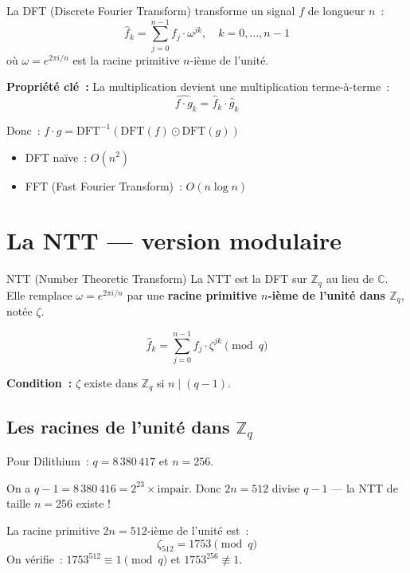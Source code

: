 \documentclass[12pt, a4paper]{article}
\newcommand{\Zq}{\mathbb{Z}_q}
\begin{document}
La DFT (Discrete Fourier Transform) transforme un signal $f$ de longueur $n$~:
$$\hat{f}_k = \sum_{j=0}^{n-1} f_j \cdot \omega^{jk}, \quad k = 0, \ldots, n-1$$
où $\omega = e^{2\pi i / n}$ est la racine primitive $n$-ième de l'unité.

\textbf{Propriété clé~:} La multiplication devient une multiplication terme-à-terme~:
$$\widehat{f \cdot g}_k = \hat{f}_k \cdot \hat{g}_k$$

Donc~: $f \cdot g = \text{DFT}^{-1}(\text{DFT}(f) \odot \text{DFT}(g))$

\begin{itemize}
  \item DFT naïve~: $O(n^2)$
  \item FFT (Fast Fourier Transform)~: $O(n \log n)$
\end{itemize}

\section{La NTT --- version modulaire}

\begin{defbox}{NTT (Number Theoretic Transform)}
La NTT est la DFT sur $\Zq$ au lieu de $\mathbb{C}$.
Elle remplace $\omega = e^{2\pi i / n}$ par une \textbf{racine primitive
$n$-ième de l'unité dans $\Zq$}, notée $\zeta$.

$$\hat{f}_k = \sum_{j=0}^{n-1} f_j \cdot \zeta^{jk} \pmod{q}$$

\textbf{Condition~:} $\zeta$ existe dans $\Zq$ si $n \mid (q-1)$.
\end{defbox}

\subsection{Les racines de l'unité dans $\Zq$}

\begin{importantbox}
Pour Dilithium~: $q = 8\,380\,417$ et $n = 256$.

On a $q - 1 = 8\,380\,416 = 2^{23} \times \text{impair}$.
Donc $2n = 512$ divise $q - 1$ --- la NTT de taille $n = 256$ existe !

La racine primitive $2n = 512$-ième de l'unité est~:
$$\zeta_{512} = 1753 \pmod{q}$$
On vérifie~: $1753^{512} \equiv 1 \pmod{q}$ et $1753^{256} \not\equiv 1$.
\end{importantbox}
\end{document}
